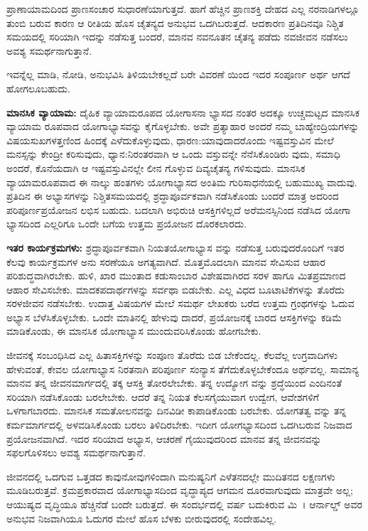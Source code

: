 ಪ್ರಾಣಾಯಾಮದಿಂದ ಪ್ರಾಣಸಂಚಾರ ಸುಧಾರಣೆಯಾಗುತ್ತದೆ. ಹಾಗೆ ಹೆಚ್ಚಿನ ಪ್ರಾಣಶಕ್ತಿ ದೇಹದ ಎಲ್ಲ ನರನಾಡಿಗಳಲ್ಲೂ ತುಂಬಿ ಬರುವ ಕಾರಣ ಆ ರೀತಿಯ ಹೊಸ ಚೈತನ್ಯದ ಅನುಭವ ಒದಗಿಬರುತ್ತದೆ. ಆದಕಾರಣ ಪ್ರತಿದಿನವೂ ನಿಶ್ಚಿತ ಸಮಯದಲ್ಲಿ ಸರಿಯಾಗಿ ಇದನ್ನು ನಡೆಸುತ್ತ ಬಂದರೆ, ಮಾನವ ನವನೂತನ ಚೈತನ್ಯ ಪಡೆದು ನವಜೀವನ ನಡೆಸಲು ಅವಶ್ಯ ಸಮರ್ಥನಾಗುತ್ತಾನೆ.

ಇವನ್ನೆಲ್ಲ ಮಾಡಿ, ನೋಡಿ, ಅನುಭವಿಸಿ ತಿಳಿಯಬೇಕಲ್ಲದೆ ಬರೇ ವಿವರಣೆ ಯಿಂದ ಇದರ ಸಂಪೂರ್ಣ ಅರ್ಥ ಆಗದೆ ಹೋಗಲೂಬಹುದು.

\textbf{ಮಾನಸಿಕ ವ್ಯಾಯಾಮ:} ದೈಹಿಕ ವ್ಯಾಯಾಮರೂಪದ ಯೋಗಾಸನಾ ಭ್ಯಾಸದ ನಂತರ ಅದಕ್ಕೂ ಉಚ್ಚಮಟ್ಟದ ಮಾನಸಿಕ ವ್ಯಾಯಾಮ ರೂಪವಾದ ಯೋಗಾಭ್ಯಾಸವನ್ನು ಕೈಗೊಳ್ಳಬೇಕು. ಅವೇ  ಪ್ರತ್ಯಾಹಾರ ಅಂದರೆ ನಮ್ಮ ಬಾಹ್ಯೇಂದ್ರಿಯಗಳನ್ನು ವಿಷಯಸುಖಗಳತ್ತಣಿಂದ ಹಿಂದಕ್ಕೆ ಎಳೆದುಕೊಳ್ಳುವುದು,  ಧಾರಣ:ಯಾವುದಾದರೊಂದು ಇಷ್ಟವಸ್ತುವಿನ ಮೇಲೆ ಮನಸ್ಸನ್ನು ಕೇಂದ್ರೀ ಕರಿಸುವುದು,  ಧ್ಯಾನ:ನಿರಂತರವಾಗಿ ಆ ಒಂದು ವಸ್ತುವನ್ನೇ ನೆನೆಸಿಕೊಂಡಿರು ವುದು,  ಸಮಾಧಿ ಅಂದರೆ, ಕೊನೆಯದಾಗಿ ಆ ಇಷ್ಟವಸ್ತುವಿನಲ್ಲೇ ಲೀನ ಗೊಳ್ಳುವ ದಿವ್ಯಚೈತನ್ಯ ಗಳಿಸುವುದು. ಮಾನಸಿಕ ವ್ಯಾಯಾಮರೂಪವಾದ ಈ ನಾಲ್ಕು ಹಂತಗಳು ಯೋಗಾಭ್ಯಾಸದ ಅಂತಿಮ ಗುರಿಸಾಧನೆಯಲ್ಲಿ ಬಹುಮುಖ್ಯ ವಾದುವು. ಪ್ರತಿದಿನ ಈ ಅಭ್ಯಾಸಗಳನ್ನು ನಿಶ್ಚಿತಸಮಯದಲ್ಲಿ ಶ್ರದ್ಧಾಪೂರ್ವಕವಾಗಿ ನಡೆಸಿಕೊಂಡು ಬಂದರೆ ಮಾತ್ರ ಅದರಿಂದ ಪರಿಪೂರ್ಣಪ್ರಯೋಜನ ಲಭಿಸ ಬಹುದು. ಬದಲಾಗಿ ಅಭಿರುಚಿ ಆಸಕ್ತಿಗಳಿಲ್ಲದೆ ಅರೆಮನಸ್ಸಿನಿಂದ ನಡೆಸಿದ ಯೋಗಾ ಭ್ಯಾಸದಿಂದ ಎಲ್ಲರಿಗೂ ಒಂದೇ ಬಗೆಯ ಉತ್ತಮ ಪ್ರಯೋಜನ ದೊರಕಲಾರದು.

\textbf{ಇತರ ಕಾರ್ಯಕ್ರಮಗಳು:} ಶ್ರದ್ಧಾಪೂರ್ವಕವಾಗಿ ನಿಯತಯೋಗಾಭ್ಯಾಸ ವನ್ನು ನಡೆಸುತ್ತ ಬರುವುದರೊಂದಿಗೆ ಇತರ ಕೆಲವು ಕಾರ್ಯಕ್ರಮಗಳ ಅನು ಸರಣೆಯೂ ಅಗತ್ಯವಾಗಿದೆ. ಮೊತ್ತಮೊದಲಾಗಿ ಮಾನವ ಸೇವಿಸುವ ಆಹಾರ ಪರಿಶುದ್ಧವಾಗಿರಬೇಕು. ಹುಳಿ, ಖಾರ ಮುಂತಾದ ಕಡುಸಾಂಬಾರ ವಿಶೇಷವಾಗಿರದ ಸರಳ ಹಾಗೂ ಮಿತಪ್ರಮಾಣದ ಆಹಾರ ಸೇವಿಸಬೇಕು. ಮಾದಕಪದಾರ್ಥಗಳನ್ನು ಸರ್ವಥಾ ಬಿಡಬೇಕು. ಎಲ್ಲ ವಿಧದ ಬೂಟಾಟಿಕೆಗಳನ್ನು ತೊರೆದು ಸರಳಜೀವನ ನಡೆಸಬೇಕು. ಉದಾತ್ತ ವಿಷಯಗಳ ಮೇಲೆ ಸಮರ್ಥ ಲೇಖಕರು ಬರೆದ ಉತ್ತಮ ಗ್ರಂಥಗಳನ್ನು ಓದುವ ಅಭ್ಯಾಸ ಬೆಳೆಸಿಕೊಳ್ಳಬೇಕು. ಒಂದೇ ಮಾತಿನಲ್ಲಿ ಹೇಳುವು ದಾದರೆ, ಪ್ರಯೋಜನಕ್ಕೆ ಬಾರದ ಆಸಕ್ತಿಗಳನ್ನು ಕಡಿಮೆ ಮಾಡಿಕೊಂಡು, ಈ ಮಾನಸಿಕ ಯೋಗಾಭ್ಯಾಸ ಮುಂದುವರಿಸಿಕೊಂಡು ಹೋಗಬೇಕು.

ಜೀವನಕ್ಕೆ ಸಂಬಂಧಿಸಿದ ಎಲ್ಲ ಹಿತಾಸಕ್ತಿಗಳನ್ನು ಸಂಪೂಣ ತೊರೆದು ಬಿಡ ಬೇಕೆಂದಲ್ಲ. ಕೆಲವೆಲ್ಲ ಉಗ್ರವಾದಿಗಳು ಹೇಳುವಂತೆ, ಕೇವಲ ಯೋಗಾಭ್ಯಾಸ ನಿರತನಾಗಿ ಪರಿಪೂರ್ಣ ಸಂನ್ಯಾಸ ತೆಗೆದುಕೊಳ್ಳಬೇಕೆಂದೂ ಅರ್ಥವಲ್ಲ. ಸಾಮಾನ್ಯ ಮಾನವ ತನ್ನ ಜೀವನಮಾರ್ಗದಲ್ಲಿ ತಕ್ಕ ಆಸಕ್ತಿ ತೋರಲೇಬೇಕು. ತನ್ನ ಉದ್ಯೋಗ ವನ್ನು ಶ್ರದ್ಧೆಯಿಂದ ಎಂದಿನಂತೆ ಸರಿಯಾಗಿ ನಡೆಸಿಕೊಂಡು ಬರಲೇಬೇಕು. ಆದರೆ ತನ್ನ ನಿಯತ ಕೆಲಸಗೈಯುವಾಗ ಉದ್ವೇಗ, ಆವೇಶಗಳಿಗೆ ಒಳಗಾಗಬಾರದು. ಮಾನಸಿಕ ಸಮತೋಲನವನ್ನು ದಿನವಿಡೀ ಕಾಪಾಡಿಕೊಂಡು ಬರಬೇಕು. ಯೋಗತತ್ವ ವನ್ನು ತನ್ನ ಕರ್ಮಮಾರ್ಗದಲ್ಲಿ ಅಳವಡಿಸಿಕೊಂಡು ಬರಲು ತಿಳಿದಿರಬೇಕು. ಇದೀಗ ಯೋಗಭ್ಯಾಸದಿಂದ ಒದಗಿಬರುವ ನಿಜವಾದ ಪ್ರಯೋಜನವಾಗಿದೆ. ಇದರ ಸರಿಯಾದ ಅಭ್ಯಾಸ, ಆಚರಣೆ ಗೈಯುವುದರಿಂದ ಮಾನವ ತನ್ನ ಜೀವನವನ್ನು ಸಫಲಗೊಳಿಸಲು ಅವಶ್ಯ ಸಮರ್ಥನಾಗುತ್ತಾನೆ.

ಜೀವನದಲ್ಲಿ ಒದಗುವ ಒತ್ತಡದ ಕಾವುನೋವುಗಳಿಂದಾಗಿ ಮನುಷ್ಯನಿಗೆ ಎಳೆತನದಲ್ಲೇ ಮುದಿತನದ ಲಕ್ಷಣಗಳು ಮೂಡಿಬರುತ್ತವೆ. ಕ್ರಮಪ್ರಕಾರವಾದ ಯೋಗಾಭ್ಯಾಸದಿಂದ ವೃದ್ಧಾಪ್ಯದ ಆಗಮನ ದೂರವಾಗುವುದು ಮಾತ್ರವೇ ಅಲ್ಲ; ಆಯುಷ್ಯದ ವೃದ್ಧಿಯೂ ಹೆಚ್ಚಿನೆಡೆ ಬಂದೇ ಬರುತ್ತದೆ. ಈ ಸಂದರ್ಭದಲ್ಲಿ  ವರ್ಷ ಬದುಕಿರುವ ಮಿ~। ಆರ್ನಾಲ್ಡ್ ಅವರ ಅನುಭವ ನಿಜವಾಗಿಯೂ ಓದುಗರ ಮೇಲೆ ಹೊಸ ಬೆಳಕು ಬೀರುವುದರಲ್ಲಿ ಸಂದೇಹವಿಲ್ಲ.

